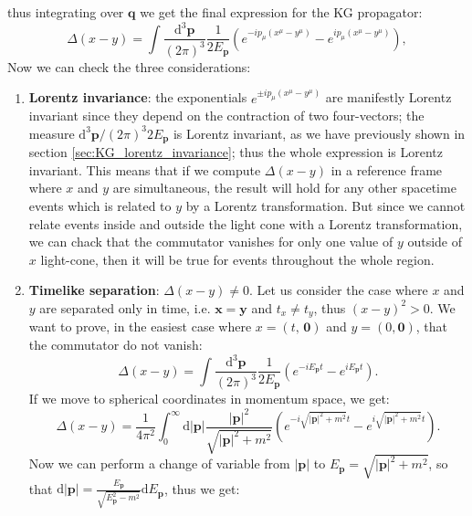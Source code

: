 thus integrating over \(\mathbf{q}\) we get the final expression for the KG propagator:
\begin{equation}
    \Delta(x-y) = \int \frac{\mathrm{d}^3 \mathbf{p}}{(2\pi)^3} \frac{1}{2E_{\mathbf{p}}} \left( e^{-i p_{\mu} (x^{\mu}-y^{\mu})} - e^{i p_{\mu} (x^{\mu}-y^{\mu})} \right),
    \label{eq:KG_propagator}
\end{equation}
Now we can check the three considerations:
\begin{enumerate}
    \item \textbf{Lorentz invariance}: the exponentials \(e^{\pm i p_{\mu} (x^{\mu}-y^{\mu})}\) are manifestly Lorentz invariant since they depend on the contraction of two four-vectors; the measure \(\mathrm{d}^3 \mathbf{p}/(2\pi)^3 2E_{\mathbf{p}}\) is Lorentz invariant, as we have previously shown in section \ref{sec:KG_lorentz_invariance}; thus the whole expression is Lorentz invariant. This means that if we compute \(\Delta(x-y)\) in a reference frame where \(x\) and \(y\) are simultaneous, the result will hold for any other spacetime events which is related to \(y\) by a Lorentz transformation. But since we cannot relate events inside and outside the light cone with a Lorentz transformation, we can chack that the commutator vanishes for only one value of \(y\) outside of \(x\) light-cone, then it will be true for events throughout the whole region.
    \item \textbf{Timelike separation}: \(\Delta(x-y) \neq 0\). Let us consider the case where \(x\) and \(y\) are separated only in time, i.e. \(\mathbf{x} = \mathbf{y}\) and \(t_x \neq t_y\), thus \((x-y)^2 > 0\). We want to prove, in the easiest case where \(x = (t,\, \mathbf{0})\) and \(y=(0, \mathbf{0})\), that the commutator do not vanish:
          \[
              \Delta(x-y) = \int \frac{\mathrm{d}^3 \mathbf{p}}{(2\pi)^3} \frac{1}{2E_{\mathbf{p}}} \left( e^{-i E_{\mathbf{p}} t} - e^{i E_{\mathbf{p}} t} \right).
          \]
          If we move to spherical coordinates in momentum space, we get:
          \[
              \Delta(x-y) = \frac{1}{4\pi^2} \int_0^{\infty} \mathrm{d}\vert \mathbf{p} \vert \frac{\vert \mathbf{p} \vert^2}{\sqrt{\vert \mathbf{p} \vert^2 + m^2}} \left( e^{-i \sqrt{\vert \mathbf{p} \vert^2 + m^2} t} - e^{i \sqrt{\vert \mathbf{p} \vert^2 + m^2} t} \right).
          \]
          Now we can perform a change of variable from \(\vert \mathbf{p} \vert\) to \(E_{\mathbf{p}} = \sqrt{\vert \mathbf{p} \vert^2 + m^2}\), so that \(\mathrm{d}\vert \mathbf{p} \vert = \frac{E_{\mathbf{p}}}{\sqrt{E^2_{\mathbf{p}} - m^2}} \mathrm{d}E_{\mathbf{p}}\), thus we get:

\end{enumerate}
